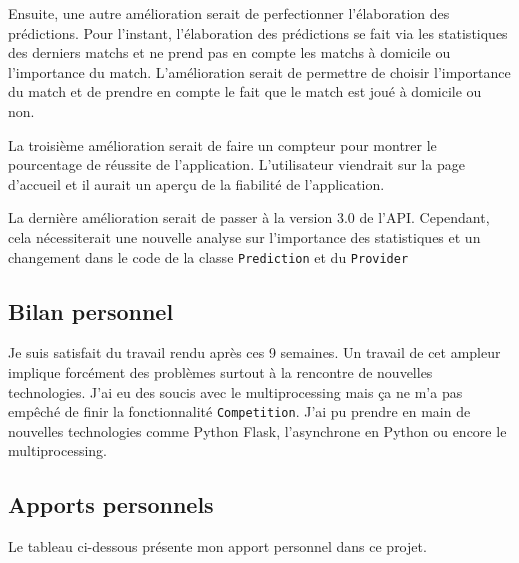 \documentclass[a4paper,14pt]{extarticle}
\begin{document}
{Ensuite, une autre amélioration serait de perfectionner l'élaboration des prédictions. Pour l'instant, l'élaboration des prédictions se fait via les statistiques des derniers matchs et ne prend pas en compte les matchs à domicile ou l'importance du match. L'amélioration serait de permettre de choisir l'importance du match et de prendre en compte le fait que le match est joué à domicile ou non.

La troisième amélioration serait de faire un compteur pour montrer le pourcentage de réussite de l'application. L'utilisateur viendrait sur la page d'accueil et il aurait un aperçu de la fiabilité de l'application. 

La dernière amélioration serait de passer à la version 3.0 de l'API. Cependant, cela nécessiterait une nouvelle analyse sur l'importance des statistiques et un changement dans le code de la classe \texttt{Prediction} et du \texttt{Provider}

\subsection{Bilan personnel}
Je suis satisfait du travail rendu après ces 9 semaines. Un travail de cet ampleur implique forcément des problèmes surtout à la rencontre de nouvelles technologies. J'ai eu des soucis avec le multiprocessing mais ça ne m'a pas empêché de finir la fonctionnalité \texttt{Competition}. J'ai pu prendre en main de nouvelles technologies comme Python Flask, l'asynchrone en Python ou encore le multiprocessing. 

\newpage

\subsection{Apports personnels}

Le tableau ci-dessous présente mon apport personnel dans ce projet. 

}
\end{document}
